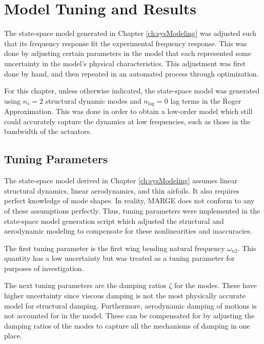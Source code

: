 \chapter{Model Tuning and Results}
\label{ch:tuning}

The state-space model generated in Chapter \ref{ch:sysModeling} was adjusted such that its frequency response fit the experimental frequency response. This was done by adjusting certain parameters in the model that each represented some uncertainty in the model's physical characteristics. This adjustment was first done by hand, and then repeated in an automated process through optimization.

For this chapter, unless otherwise indicated, the state-space model was generated using $n_s=2$ structural dynamic modes and $n_\text{lag}=0$ lag terms in the Roger Approximation. This was done in order to obtain a low-order model which still could accurately capture the dynamics at low frequencies, such as those in the bandwidth of the actuators.


\section{Tuning Parameters} %

The state-space model derived in Chapter \ref{ch:sysModeling} assumes linear structural dynamics, linear aerodynamics, and thin airfoils. It also requires perfect knowledge of mode shapes. In reality, MARGE does not conform to any of these assumptions perfectly. Thus, tuning parameters were implemented in the state-space model generation script which adjusted the structural and aerodynamic modeling to compensate for these nonlinearities and inaccuracies.

The first tuning parameter is the first wing bending natural frequency $\omega_{n2}$. This quantity has a low uncertainty but was treated as a tuning parameter for purposes of investigation.

The next tuning parameters are the damping ratios $\zeta$ for the modes. These have higher uncertainty since viscous damping is not the most physically accurate model for structural damping. Furthermore, aerodynamic damping of motions is not accounted for in the model. These can be compensated for by adjusting the damping ratios of the modes to capture all the mechanisms of damping in one place.

